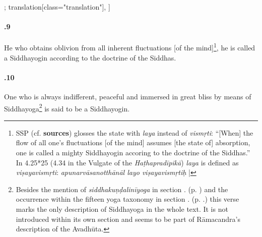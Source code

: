 \begin{alignment}[
  texts=edition[class="edition"];
  translation[class="translation"],
  ]
\begin{translation}
\begin{tlate}[44_9]
      \paragraph{.9} He who obtains oblivion from all inherent fluctuations [of the mind]\footnote{SSP (cf. \textbf{sources}) glosses the state with \textit{laya} instead of \textit{vismṛti}: ``[When] the flow of all one's fluctuations [of the mind] assumes [the state of] absorption, one is called a mighty Siddhayogin accoring to the doctrine of the Siddhas.'' In  4.25*25 (4.34 in the Vulgate of the \textit{Haṭhapradīpikā}) \textit{laya} is defined as \textit{viṣayavismṛti}: \textit{apunarvāsanotthānāl layo viṣayavismṛtiḥ} |}, he is called a Siddhayogin according to the doctrine of the Siddhas.
    \end{tlate}
    \begin{tlate}[44_10]
      \paragraph{.10} One who is always indifferent, peaceful and immersed in great bliss by means of Siddhayoga\footnote{Besides the mention of \textit{siddhakuṇḍalinīyoga} in section . (p. \pageref{siddhayoga}) and the occurrence within the fifteen yoga taxonomy in section . (p. \pageref{intro}.) this verse marks the only description of Siddhayoga in the whole text. It is not introduced within its own section and seems to be part of Rāmacandra's description of the Avadhūta.} is said to be a Siddhayogin.
    \end{tlate}
  \end{translation}
\end{alignment}
\pagebreak %
